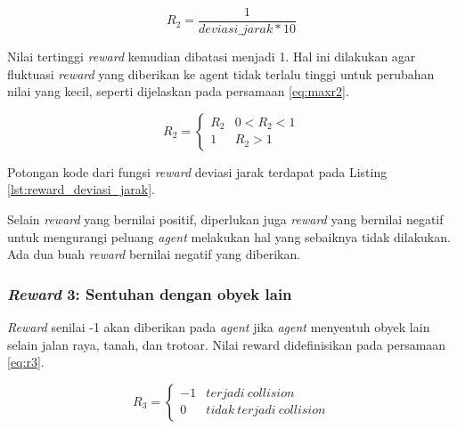 \begin{equation}
	R_2 = \frac{1}{deviasi\_jarak*10}
	\label{eq:r2}
\end{equation}

Nilai tertinggi \textit{reward} kemudian dibatasi menjadi 1. Hal ini dilakukan agar fluktuasi \textit{reward }yang diberikan ke agent tidak terlalu tinggi untuk perubahan nilai yang kecil, seperti dijelaskan pada persamaan \ref{eq:maxr2}.

\begin{equation}
	R_2 = \begin{cases}R_2 & 0 < R_2 < 1\\1 & R_2 > 1\end{cases}
	\label{eq:maxr2}
\end{equation}


Potongan kode dari fungsi \textit{reward} deviasi jarak terdapat pada Listing \ref{lst:reward_deviasi_jarak}.

Selain \textit{reward} yang bernilai positif, diperlukan juga \textit{reward} yang bernilai negatif untuk mengurangi peluang \textit{agent} melakukan hal yang sebaiknya tidak dilakukan. Ada dua buah \textit{reward} bernilai negatif yang diberikan.

\subsubsection{\textit{Reward} 3: Sentuhan dengan obyek lain}
\textit{Reward} senilai -1 akan diberikan pada \textit{agent} jika \textit{agent} menyentuh obyek lain selain jalan raya, tanah, dan trotoar. Nilai reward didefinisikan pada persamaan \ref{eq:r3}.

\begin{equation}
	R_3 = \begin{cases}-1 & terjadi\: collision\\0 & tidak\:terjadi\: collision\end{cases}
	\label{eq:r3}
\end{equation}


